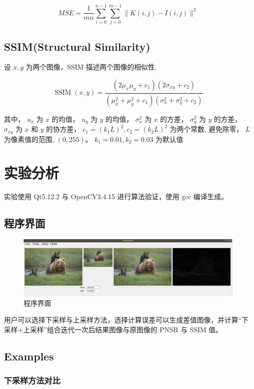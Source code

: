 \documentclass[12pt]{article}
\begin{document}
	$$
	M S E=\frac{1}{m n} \sum_{i=0}^{n-1} \sum_{j=0}^{m-1}\|K(i, j)-I(i, j)\|^{2}
	$$
	
	\subsection{SSIM(Structural Similarity)}
	设 $x,y$ 为两个图像，SSIM 描述两个图像的相似性.
	
	$$
	\operatorname{SSIM}(x, y)=\frac{\left(2 \mu_{x} \mu_{y}+c_{1}\right)\left(2 \sigma_{x y}+c_{2}\right)}{\left(\mu_{x}^{2}+\mu_{y}^{2}+c_{1}\right)\left(\sigma_{x}^{2}+\sigma_{y}^{2}+c_{2}\right)}
	$$
	
	其中，
	$u_{x}$ 为 $x$ 的均值，
	$u_{y}$ 为 $y$ 的均值，
	$\sigma_{x}^{2}$ 为 $x$ 的方差，
	$\sigma_{y}^{2}$ 为 $y$ 的方差，
	$\sigma_{x y}$ 为 $x$ 和 $y$ 的协方差，
	$c_{1}=\left(k_{1} L\right)^{2}, c_{2}=\left(k_{2} L\right)^{2}$ 为两个常数, 避免除零，
	$L$ 为像素值的范围, $(0,255)$。
	$k_{1}=0.01, k_{2}=0.03$ 为默认值
	
	
	\section{实验分析}
	实验使用 Qt5.12.2 与 OpenCV3.4.15 进行算法验证，使用 gcc 编译生成。
	
		\subsection{程序界面}
	\begin{figure}[H]
		\centering
		\includegraphics[width=6in]{./ui.png}
		\centering
		\caption{程序界面}
	\end{figure}
	
	用户可以选择下采样与上采样方法，选择计算误差可以生成差值图像，并计算“下采样+上采样”组合迭代一次后结果图像与原图像的 PNSR 与 SSIM 值。
	
	\subsection{Examples}
	
	\subsubsection{下采样方法对比}
	
\end{document}
